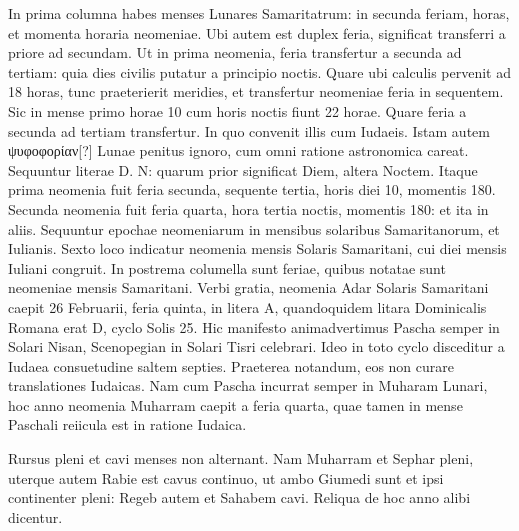 \begin{table}[htbp]
  
\end{table}

In prima columna habes menses Lunares Samaritatrum:
 in secunda
feriam, horas, et momenta horaria neomeniae.
Ubi autem est duplex
feria, significat transferri a priore ad secundam.
Ut in prima neomenia,
feria transfertur a secunda ad tertiam: quia dies civilis putatur
a principio noctis.
Quare ubi calculis pervenit ad 18 horas, tunc
praeterierit meridies, et transfertur neomeniae feria in sequentem.
Sic
in mense primo horae 10 cum horis noctis fiunt 22 horae.
Quare feria
a secunda ad tertiam transfertur.
In quo convenit illis cum Iudaeis.
Istam autem \textgreek{ψυφοφορίαν[?]} Lunae penitus ignoro,
 cum omni ratione
astronomica careat.
Sequuntur literae \textsc{D. N}: quarum prior significat
Diem, altera Noctem.
Itaque prima neomenia fuit feria secunda, sequente
tertia, horis diei 10, momentis 180.
Secunda neomenia fuit feria
quarta, hora tertia noctis, momentis 180: et ita in aliis.
Sequuntur
epochae neomeniarum in mensibus solaribus Samaritanorum, et Iulianis.
Sexto loco indicatur neomenia mensis Solaris Samaritani, cui
diei mensis Iuliani congruit.
In postrema columella sunt feriae, quibus
notatae sunt neomeniae mensis Samaritani.
Verbi gratia, neomenia
Adar Solaris Samaritani caepit 26 Februarii, feria quinta, in litera
\textsc{A}, quandoquidem litara Dominicalis Romana erat \textsc{D},
 cyclo Solis 25.
Hic manifesto animadvertimus Pascha semper in Solari Nisan, Scenopegian
in Solari Tisri celebrari.
Ideo in toto cyclo disceditur a Iudaea
consuetudine saltem septies.
Praeterea %
 notandum, eos non curare
translationes Iudaicas.
Nam cum Pascha incurrat semper in Muharam
Lunari, hoc anno neomenia Muharram caepit a feria quarta, quae
tamen in mense Paschali reiicula est in ratione Iudaica.

Rursus pleni
et cavi menses non alternant.
Nam Muharram et Sephar pleni, uterque
autem Rabie est cavus continuo, ut ambo Giumedi sunt et ipsi
continenter pleni: Regeb autem et Sahabem cavi.
Reliqua de hoc
anno alibi dicentur.

